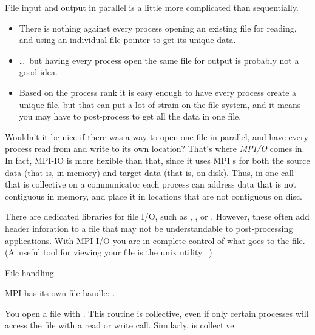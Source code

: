 

File input and output in parallel is a little more complicated than
sequentially.
\begin{itemize}
\item There is nothing against every process opening an existing file
  for reading, and using an individual file pointer to get its unique
  data.
\item \ldots~but having every process open the same file for output is
  probably not a good idea.
\item Based on the process rank it is easy enough to have
  every process create a unique file, but that can put a lot of strain
  on the file system, and it means you may have to post-process 
  to get all the data in one file.
\end{itemize}

Wouldn't it be nice if there was a way to open one file in parallel,
and have every process read from and write to its own location? That's
where \emph{MPI/O} comes in.
In fact, MPI-IO is more flexible than that, since it uses MPI
s for both the source data (that is, in memory)
and target data (that is, on disk).
Thus, in one call that is collective on a communicator
each process can address data that is not contiguous in memory,
and place it in locations that are not contiguous on disc.

There are dedicated libraries for file I/O, such as ,
, or . However, these often add
header inforation to a file that may not be understandable to
post-processing applications. With MPI I/O you are in complete control
of what goes to the file. (A~useful tool for viewing your file is the
unix utility~.)

 {File handling}

MPI has its own file handle:
.

You open a file with
%
.
%
This routine is collective, even if only certain processes will access
the file with a read or write call.
Similarly,  is collective.

